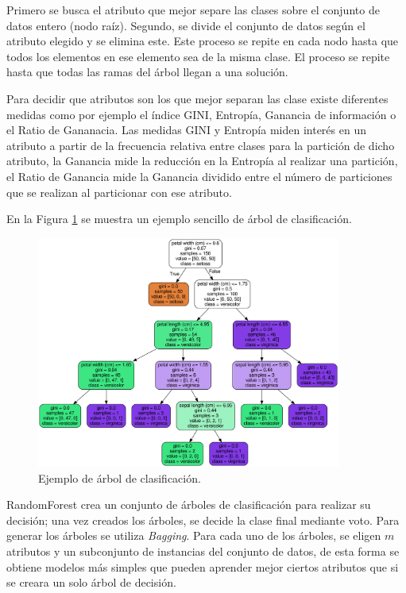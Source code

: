 Primero se busca el atributo que mejor separe las clases sobre el conjunto de datos entero (nodo raíz). Segundo, se divide el conjunto de datos según el atributo elegido y se elimina este. Este proceso se repite en cada nodo hasta que todos los elementos en ese elemento sea de la misma clase. El proceso se repite hasta que todas las ramas del árbol llegan a una solución.\newline

Para decidir que atributos son los que mejor separan las clase existe diferentes medidas como por ejemplo el índice GINI, Entropía, Ganancia de información o el Ratio de Gananacia. Las medidas GINI y Entropía miden interés en un atributo a partir de la frecuencia relativa entre clases para la partición de dicho atributo, la Ganancia mide la reducción en la Entropía al realizar una partición, el Ratio de Ganancia mide la Ganancia dividido entre el número de particiones que se realizan al particionar con ese atributo. \newline

En la Figura \ref{fig:216} se muestra un ejemplo sencillo de árbol de clasificación.

\begin{figure}[H]
	\centering
	\includegraphics[width=100mm]{imagenes/tree_example.png}
	\caption{Ejemplo de árbol de clasificación.}
	\label{fig:216}
\end{figure}
\verticalspace

RandomForest crea un conjunto de árboles de clasificación para realizar su decisión; una vez creados los árboles, se decide la clase final mediante voto. Para generar los árboles se utiliza \textit{Bagging}. Para cada uno de los árboles, se eligen $m$ atributos y un subconjunto de instancias del conjunto de datos, de esta forma se obtiene modelos más simples que pueden aprender mejor ciertos atributos que si se creara un solo árbol de decisión.\newline


